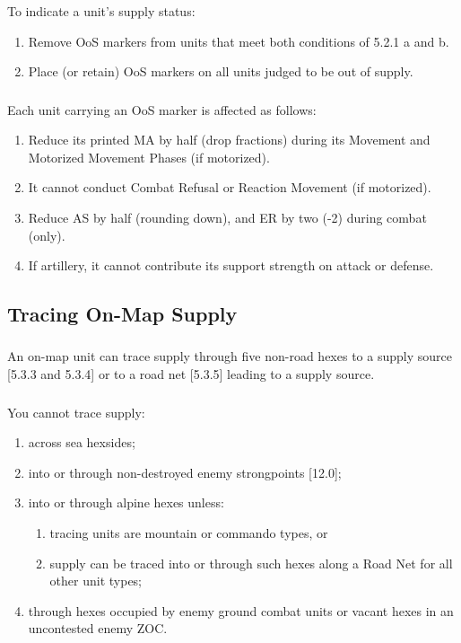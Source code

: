 \subsubsection{}
To indicate a unit's supply status:

\begin{enumerate}[label=\alph*.]
    \item Remove OoS markers from units that meet both conditions of 5.2.1 a and b.
    \item Place (or retain) OoS markers on all units judged to be out of supply.
\end{enumerate}

\subsubsection{}
Each unit carrying an OoS marker is affected as follows:
\begin{enumerate}[label=\alph*.]
    \item Reduce its printed MA by half (drop fractions) during its Movement and Motorized Movement Phases (if motorized).
    \item It cannot conduct Combat Refusal or Reaction Movement (if motorized).
    \item Reduce AS by half (rounding down), and ER by two (-2) during combat (only).
    \item If artillery, it cannot contribute its support strength on attack or defense.
\end{enumerate}

\subsection{Tracing On-Map Supply}
\subsubsection{}
An on-map unit can trace supply through five non-road hexes to a supply source [5.3.3 and 5.3.4] or to a road net [5.3.5] leading to a supply source.

\subsubsection{}
You cannot trace supply:
\begin{enumerate}[label=\alph*.]
    \item across sea hexsides;
    \item into or through non-destroyed enemy strongpoints [12.0];
    \item into or through alpine hexes unless:
    \begin{enumerate}[label=\arabic*.]
        \item tracing units are mountain or commando types, or
        \item supply can be traced into or through such hexes along a Road Net for all other unit types;
    \end{enumerate}
    \item through hexes occupied by enemy ground combat units or vacant hexes in an uncontested enemy ZOC.
\end{enumerate}

